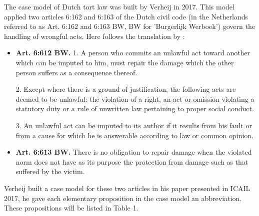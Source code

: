 \documentclass{IOS-Book-Article}
\begin{document}

\noindent The case model of Dutch tort law was built by Verheij in 2017\citep{Verheij2017Formalizing}. This model applied two articles 6:162 and 6:163 of the Dutch civil code (in the Netherlands referred to as Art. 6:162 and 6:163 BW, BW for 'Burgerlijk Werboek') govern the handling of wrongful acts. Here follows the translation by \citep{Betlem1993Civil}:

\begin{itemize}
\item \textbf{Art. 6:612 BW.} 1. A person who commits an unlawful act toward another which can be imputed to him, must repair the damage which the other person suffers as a consequence thereof.

2. Except where there is a ground of justification, the following acts are deemed to be unlawful: the violation of a right, an act or omission violating a statutory duty or a rule of unwritten law pertaining to proper social conduct.

3. An unlawful act can be imputed to its author if it results from his fault or from a cause for which he is answerable according to law or common opinion.

\item \textbf{Art. 6:613 BW.} There is no obligation to repair damage when the violated norm does not have as its purpose the protection from damage such as that suffered by the victim.
\end{itemize}

Verheij built a case model for these two articles in his paper presented in ICAIL 2017\citep{Verheij2017Formalizing}, he gave each elementary proposition in the case model an abbreviation. These propositions will be listed in Table 1.
\end{document}

